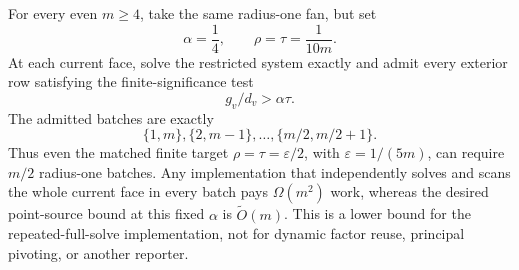 \begin{proposition}
\label{prop:aesp-cd-fan-finite-linear-batches}
For every even \(m\geq4\), take the same radius-one fan, but set
\begin{equation*}
 \alpha=\frac14,
 \qquad
 \rho=\tau=\frac1{10m}.
\end{equation*}
At each current face, solve the restricted system exactly and admit every
exterior row satisfying the finite-significance test
\begin{equation*}
 g_v/d_v>\alpha\tau.
\end{equation*}
The admitted batches are exactly
\begin{equation*}
 \{1,m\},\{2,m-1\},\ldots,\{m/2,m/2+1\}.
\end{equation*}
Thus even the matched finite target
\(\rho=\tau=\varepsilon/2\), with \(\varepsilon=1/(5m)\), can require
\(m/2\) radius-one batches.  Any implementation that independently solves
and scans the whole current face in every batch pays \(\Omega(m^2)\) work,
whereas the desired point-source bound at this fixed \(\alpha\) is
\(\widetilde O(m)\).  This is a lower bound for the repeated-full-solve
implementation, not for dynamic factor reuse, principal pivoting, or another
reporter.
\end{proposition}

